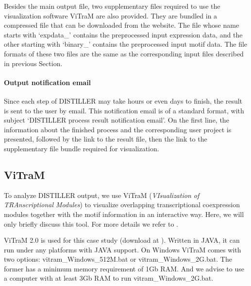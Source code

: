 Besides the main output file, two supplementary files required to use the
visualization software ViTraM are also provided. They are bundled in a
compressed file that can be downloaded from the website. The file whose name
starts with `expdata\_' contains the preprocessed input expression data, and the
other starting with `binary\_' contains the preprocessed input motif data. The
file formats of these two files are the same as the corresponding input files
described in previous Section.


\paragraph{Output notification email}\label{sec:distiller-email}
Since each step of DISTILLER may take hours or even days to finish, the result
is sent to the user by email. This notification email is of a standard format,
with subject `DISTILLER process result notification email'. On the first line,
the information about the finished process and the corresponding user project is
presented, followed by the link to the result file, then the link to the
supplementary file bundle required for visualization.


\subsection{ViTraM}\label{sec:dist-vitram}
To analyze DISTILLER output, we use ViTraM (\textit{VIsualization of
  TRAnscriptional Modules}) to visualize overlapping transcriptional
coexpression modules together with the motif information in an interactive
way. Here, we will only briefly discuss this tool. For more details we refer to
\cite{Sun2009}.

ViTraM 2.0 is used for this case study (download at \cite{ViTraM}).  Written in
JAVA, it can run under any platforms with JAVA support.  On Windows ViTraM comes
with two options: vitram\_Windows\_512M.bat or vitram\_Windows\_2G.bat. The
former has a minimum memory requirement of 1Gb RAM.  And we advise to use a
computer with at least 3Gb RAM to run vitram\_Windows\_2G.bat. 


